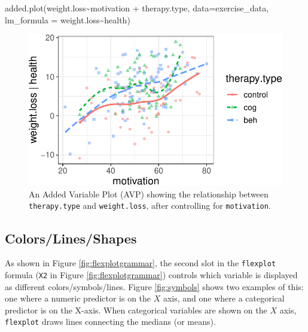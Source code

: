 \documentclass[
  english,
  man]{apa6}
\newenvironment{Shaded}{\begin{snugshade}}{\end{snugshade}}
\newcommand{\AttributeTok}[1]{\textcolor[rgb]{0.77,0.63,0.00}{#1}}
\newcommand{\FunctionTok}[1]{\textcolor[rgb]{0.00,0.00,0.00}{#1}}
\newcommand{\NormalTok}[1]{#1}
\newcommand{\SpecialCharTok}[1]{\textcolor[rgb]{0.00,0.00,0.00}{#1}}
\begin{document}
\begin{Shaded}
\begin{Highlighting}[]
\FunctionTok{added.plot}\NormalTok{(weight.loss}\SpecialCharTok{\textasciitilde{}}\NormalTok{motivation }\SpecialCharTok{+}\NormalTok{ therapy.type, }\AttributeTok{data=}\NormalTok{exercise\_data, }\AttributeTok{lm\_formula =}\NormalTok{ weight.loss}\SpecialCharTok{\textasciitilde{}}\NormalTok{health)}
\end{Highlighting}
\end{Shaded}

\begin{figure}
\centering
\includegraphics{flexplot_psychmeth_files/figure-latex/avp-4.pdf}
\caption{\label{fig:avp-4}An Added Variable Plot (AVP) showing the relationship between \texttt{therapy.type} and \texttt{weight.loss}, after controlling for \texttt{motivation}. \label{fig:avp}}
\end{figure}

\normalsize

\hypertarget{colorslinesshapes}{%
\subsection{Colors/Lines/Shapes}\label{colorslinesshapes}}

As shown in Figure \ref{fig:flexplotgrammar}, the second slot in the \texttt{flexplot} formula (\texttt{X2} in Figure \ref{fig:flexplotgrammar}) controls which variable is displayed as different colors/symbols/lines. Figure \ref{fig:symbols} shows two examples of this: one where a numeric predictor is on the \(X\) axis, and one where a categorical predictor is on the X-axis. When categorical variables are shown on the \(X\) axis, \texttt{flexplot} draws lines connecting the medians (or means).
\end{document}
